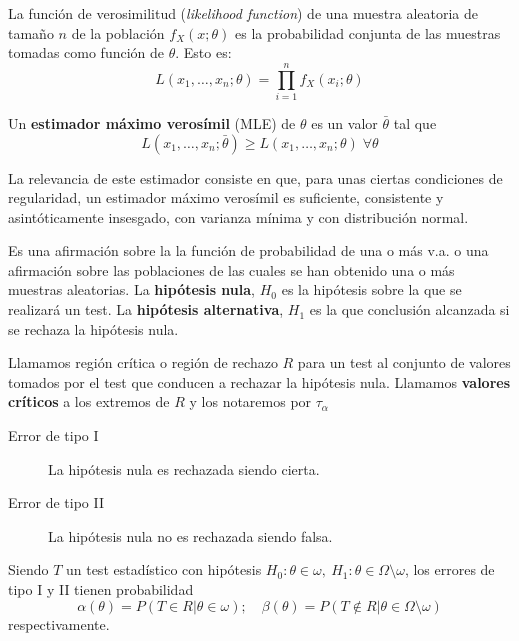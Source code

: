 \begin{definicion}
	La función de verosimilitud (\textit{likelihood 
function}) de una muestra aleatoria de tamaño $n$ de la 
población $f_X(x;\theta)$ es la probabilidad conjunta de las 
muestras tomadas como función de $\theta$. Esto es:
	\[ L(x_1, \dots, x_n; \theta) = 
		\prod\limits_{i=1}^n f_X(x_i;\theta)	\]
\end{definicion}

	Un \textbf{estimador máximo verosímil} (MLE) de $\theta$ 
es un valor $\bar{\theta}$ tal que 
	\[ 
		L(x_1, \dots, x_n; \bar{\theta}) \geq 
			L(x_1, \dots, x_n; \theta) \; \forall \theta 	
	\]
	
	La relevancia de este estimador consiste en que, para 
unas ciertas condiciones de regularidad, un estimador máximo 
verosímil es suficiente, consistente y asintóticamente 
insesgado, con varianza mínima y con distribución normal.
	
\begin{definicion}
	Es una afirmación sobre la la función de probabilidad de 
una o más v.a. o una afirmación sobre las poblaciones de las 
cuales se han obtenido una o más muestras aleatorias. La 
\textbf{hipótesis nula}, $H_0$ es la hipótesis sobre la que 
se realizará un test. La \textbf{hipótesis alternativa}, 
$H_1$ es la que conclusión alcanzada si se rechaza la 
hipótesis nula.
\end{definicion}

\begin{definicion}
	Llamamos región crítica o región de rechazo $R$ para un 
test al conjunto de valores tomados por el test que conducen 
a rechazar la hipótesis nula. Llamamos \textbf{valores 
críticos} a los extremos de $R$ y los notaremos por $\tau_
\alpha$
\end{definicion}

\begin{definicion}\textit{}
	\begin{description}
	\item[Error de tipo I] La hipótesis nula es rechazada 
		siendo cierta.
	\item[Error de tipo II] La hipótesis nula no es rechazada 
		siendo falsa.
	\end{description}
\end{definicion}

	Siendo $T$ un test estadístico con hipótesis $H_0: \theta 
\in \omega, \ H_1: \theta \in \Omega \setminus \omega$, los 
errores de tipo I y II tienen probabilidad
	\[ 
	\alpha(\theta) = P(T \in R | \theta \in \omega); \quad
	\beta(\theta) = 
		P(T \not\in R | 
				\theta \in \Omega \setminus \omega)
	\]
	respectivamente.

